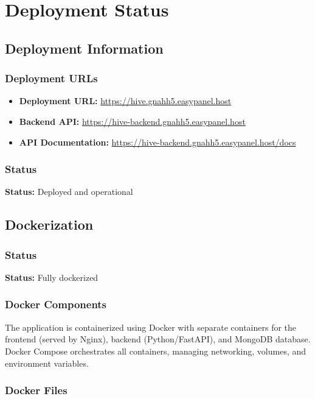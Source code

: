 \documentclass[12pt,a4paper]{report}
\begin{document}
\chapter{Deployment Status}

\section{Deployment Information}

\subsection{Deployment URLs}

\begin{itemize}
    \item \textbf{Deployment URL:} \url{https://hive.gnahh5.easypanel.host}
    \item \textbf{Backend API:} \url{https://hive-backend.gnahh5.easypanel.host}
    \item \textbf{API Documentation:} \url{https://hive-backend.gnahh5.easypanel.host/docs}
\end{itemize}

\subsection{Status}

\textbf{Status:} Deployed and operational

\section{Dockerization}

\subsection{Status}

\textbf{Status:} Fully dockerized

\subsection{Docker Components}

The application is containerized using Docker with separate containers for the frontend (served by Nginx), backend (Python/FastAPI), and MongoDB database. Docker Compose orchestrates all containers, managing networking, volumes, and environment variables.

\subsection{Docker Files}
\end{document}
